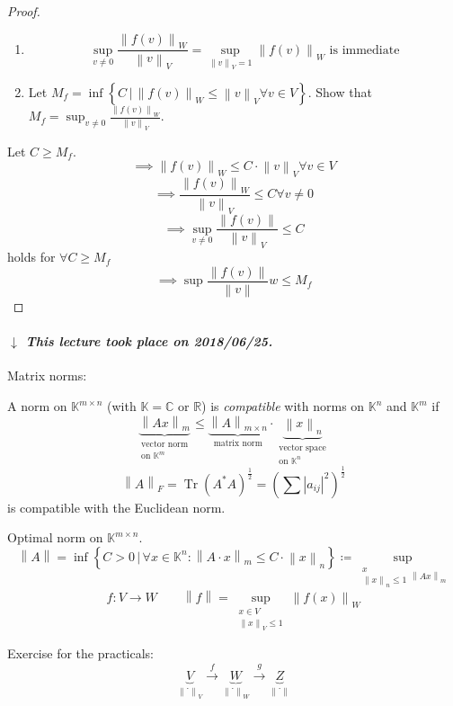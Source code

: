 \documentclass{article}
\newcommand{\setdef}[2]{\left\{\left.#1\,\right|\,#2\right\}}
\newcommand{\norm}[1]{\left\|#1\right\|}
\newcommand{\card}[1]{\left|#1\right|}
\newcommand{\dateref}[1]{%
  \begin{mdframed}[backgroundcolor=gray!10,innerbottommargin=0pt,innertopmargin=0pt]
    \paragraph{\textit{$\downarrow$ This lecture took place on #1.}}%
  \end{mdframed}%
}
\begin{document}
\begin{proof}
  \begin{enumerate}
    \item \[ \sup_{v \neq 0} \frac{\norm{f(v)}_W}{\norm{v}_V} = \sup_{\norm{v}_V = 1} \norm{f(v)}_W \text{ is immediate} \]
    \item Let $M_f = \inf\setdef{C}{\norm{f(v)}_W \leq \norm{v}_V \forall v \in V}$. Show that $M_f = \sup_{v \neq 0} \frac{\norm{f(v)}_W}{\norm{v}_V}$.
  \end{enumerate}

  Let $C \geq M_f$.
  \[ \implies \norm{f(v)}_W \leq C \cdot \norm{v}_V \forall v \in V \]
  \[ \implies \frac{\norm{f(v)}_W}{\norm{v}_V} \leq C \forall v \neq 0 \]
  \[ \implies \sup_{v \neq 0} \frac{\norm{f(v)}}{\norm{v}_V} \leq C \]
  holds for $\forall C \geq M_f$
  \[ \implies \sup{\frac{\norm{f(v)}}{\norm{v}}} w \leq M_f \]
\end{proof}

\dateref{2018/06/25}

Matrix norms:

A norm on $\mathbb K^{m \times n}$ (with $\mathbb K = \mathbb C$ or $\mathbb R$) is \emph{compatible} with norms on $\mathbb K^n$ and $\mathbb K^m$ if
\[
  \underbrace{\norm{Ax}_m}_{\substack{\text{vector norm} \\ \text{on } \mathbb K^m}}
  \leq
  \underbrace{\norm{A}_{m \times n}}_{\text{matrix norm}} \cdot \underbrace{\norm{x}_n}_{\substack{\text{vector space} \\ \text{on } \mathbb K^n}}
\]
\[ \norm{A}_F = \operatorname{Tr}(A^* A)^{\frac12} = \left(\sum \card{a_{ij}}^2\right)^{\frac12} \]
is compatible with the Euclidean norm.

Optimal norm on $\mathbb K^{m \times n}$.
\[ \norm A = \inf\setdef{C > 0}{\forall x \in \mathbb K^n: \norm{A \cdot x}_m \leq C \cdot \norm{x}_n} \coloneqq \sup_{\substack{x \\ \norm{x}_n \leq 1} \norm{Ax}_m} \]
\[ f: V \to W \qquad \norm{f} = \sup_{\substack{x \in V \\ \norm{x}_V \leq 1}} \norm{f(x)}_W \]

Exercise for the practicals:
\[ \underbrace{V}_{\norm{\cdot}_V} \xrightarrow f \underbrace{W}_{\norm{\cdot}_W} \xrightarrow g \underbrace{Z}_{\norm{\cdot}} \]
\end{document}
